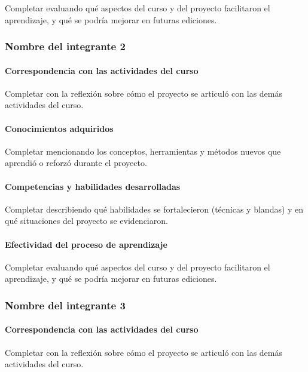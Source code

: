 \documentclass[11pt,a4paper]{article}
\begin{document}
Completar evaluando qué aspectos del curso y del proyecto facilitaron el
aprendizaje, y qué se podría mejorar en futuras ediciones.

\subsubsection*{Nombre del integrante 2}


\paragraph{Correspondencia con las actividades del curso}

Completar con la reflexión sobre cómo el proyecto se articuló con las demás
actividades del curso.

\paragraph{Conocimientos adquiridos}

Completar mencionando los conceptos, herramientas y métodos nuevos que
aprendió o reforzó durante el proyecto.

\paragraph{Competencias y habilidades desarrolladas}

Completar describiendo qué habilidades se fortalecieron (técnicas y blandas)
y en qué situaciones del proyecto se evidenciaron.

\paragraph{Efectividad del proceso de aprendizaje}

Completar evaluando qué aspectos del curso y del proyecto facilitaron el
aprendizaje, y qué se podría mejorar en futuras ediciones.

\subsubsection*{Nombre del integrante 3}


\paragraph{Correspondencia con las actividades del curso}

Completar con la reflexión sobre cómo el proyecto se articuló con las demás
actividades del curso.
\end{document}
